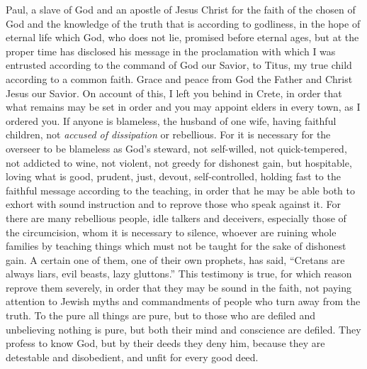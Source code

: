 
\begin{biblechapter} %
 Paul, a slave of God and an apostle of Jesus Christ for the faith of the chosen of God and the knowledge of the truth that is according to godliness,
\verse in the hope of eternal life which God, who does not lie, promised before eternal ages,
\verse but at the proper time has disclosed his message in the proclamation with which I was entrusted according to the command of God our Savior,
\verse to Titus, my true child according to a common faith. Grace and peace from God the Father and Christ Jesus our Savior.
 On account of this, I left you behind in Crete, in order that what remains may be set in order and you may appoint elders in every town, as I ordered you.
\verse If anyone is blameless, the husband of one wife, having faithful children, not \textit{accused of dissipation} or rebellious.
\verse For it is necessary for the overseer to be blameless as God’s steward, not self-willed, not quick-tempered, not addicted to wine, not violent, not greedy for dishonest gain,
\verse but hospitable, loving what is good, prudent, just, devout, self-controlled,
\verse holding fast to the faithful message according to the teaching, in order that he may be able both to exhort with sound instruction and to reprove those who speak against it.
\verse For there are many rebellious people, idle talkers and deceivers, especially those of the circumcision,
\verse whom it is necessary to silence, whoever are ruining whole families by teaching things which must not be taught for the sake of dishonest gain.
\verse A certain one of them, one of their own prophets, has said, “Cretans are always liars, evil beasts, lazy gluttons.”
\verse This testimony is true, for which reason reprove them severely, in order that they may be sound in the faith,
\verse not paying attention to Jewish myths and commandments of people who turn away from the truth.
\verse To the pure all things are pure, but to those who are defiled and unbelieving nothing is pure, but both their mind and conscience are defiled.
\verse They profess to know God, but by their deeds they deny him, because they are detestable and disobedient, and unfit for every good deed.
\end{biblechapter}

